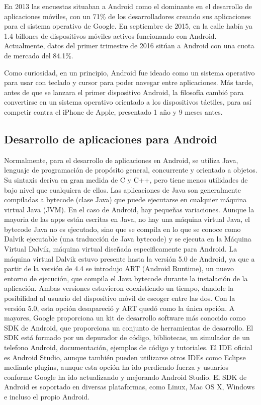 \documentclass[
10pt, %
a4paper, %
oneside, %
headinclude,footinclude, %
BCOR5mm, %
]{scrartcl}
\begin{document}
En 2013 las encuestas situaban a Android como el dominante en el desarrollo de aplicaciones móviles, con un 71\% de los desarrolladores creando sus aplicaciones para el sistema operativo de Google. En septiembre de 2015, en la calle había ya 1.4 billones de dispositivos móviles activos funcionando con Android. Actualmente, datos del primer trimestre de 2016 sitúan a Android con una cuota de mercado del 84.1\%.

Como curiosidad, en un principio, Android fue ideado como un sistema operativo para usar con teclado y cursor para poder navegar entre aplicaciones. Más tarde, antes de que se lanzara el primer dispositivo Android, la filosofía cambió para convertirse en un sistema operativo orientado a los dispositivos táctiles, para así competir contra el iPhone de Apple, presentado 1 año y 9 meses antes.

\subsection{Desarrollo de aplicaciones para Android}
Normalmente, para el desarrollo de aplicaciones en Android, se utiliza Java, lenguaje de programación de propósito general, concurrente y orientado a objetos. Su sintaxis deriva en gran medida de C y C++, pero tiene menos utilidades de bajo nivel que cualquiera de ellos. Las aplicaciones de Java son generalmente compiladas a bytecode (clase Java) que puede ejecutarse en cualquier máquina virtual Java (JVM). En el caso de Android, hay pequeñas variaciones. Aunque la mayoria de las apps están escritas en Java, no hay una máquina virtual Java, el bytecode Java no es ejecutado, sino que se compila en lo que se conoce como Dalvik ejecutable (una traducción de Java bytecode) y se ejecuta en la Máquina Virtual Dalvik, máquina virtual diseñada especificamente para Android. La máquina virtual Dalvik estuvo presente hasta la versión 5.0 de Android, ya que a partir de la versión de 4.4 se introdujo ART (Android Runtime), un nuevo entorno de ejecución, que compila el Java bytecode durante la instalación de la aplicación. Ambas versiones estuvieron coexistiendo un tiempo, dandole la posibilidad al usuario del dispositivo móvil de escoger entre las dos. Con la versión 5.0, esta opción desapareció y ART quedó como la única opción. A mayores, Google proporciona un kit de desarrollo software más conocido como SDK de Android, que proporciona un conjunto de herramientas de desarrollo. El SDK está formado por un depurador de código, bibliotecas, un simulador de un telefono Android, documentación, ejemplos de código y tutoriales. El IDE oficial es Android Studio, aunque también pueden utilizarse otros IDEs como Eclipse mediante plugins, aunque esta opción ha ido perdiendo fuerza y usuarios conforme Google ha ido actualizando y mejorando Android Studio. El SDK de Android es soportado en diversas plataformas, como Linux, Mac OS X, Windows e incluso el propio Android.
\end{document}
